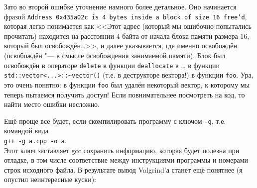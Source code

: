 Зато во второй ошибке уточнение намного более детальное. Оно начинается фразой \texttt{Address 0x435a02c is 4 bytes inside a block of size 16 free'd},
которая легко понимается как <<Этот адрес (который мы ошибочно попытались прочитать) находится на расстоянии 4 байта от начала блока памяти размера 16,
который был освобождён\dots>>, и далее указывается, где именно освобождён (освобождён "--- в смысле освобождения занимаемой памяти). 
Блок был освобождён в операторе \verb`delete` в функции \verb`deallocate` в \dots{} в функции \verb`std::vector<...>::~vector()` (т.е. в деструкторе вектора!)
в функции \verb`foo`. 
Ура, это очень понятно: в функции \verb`foo` был удалён некоторый вектор, к которому мы теперь пытаемся получить доступ! 
Если повнимательнее посмотреть на код, то найти место ошибки несложно.

Ещё проще все будет, если скомпилировать программу с ключом \verb`-g`, т.е. командой вида\\
\verb`g++ -g a.cpp -o a`. \\
Этот ключ заставляет gcc сохранить информацию, которая будет полезна при отладке, в том числе соответствие между инструкциями программы
и номерами строк исходного файла. В результате вывод Valgrind'а станет ещё понятнее (я опустил неинтересные куски):
